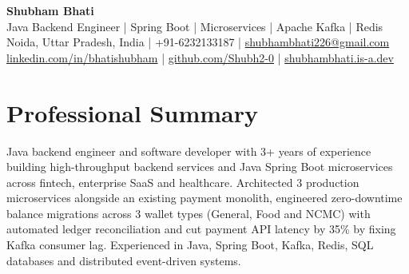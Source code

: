 \documentclass[letterpaper]{article}
\begin{document}
\vspace*{-18pt}
\begin{center}
    \textbf{\Huge Shubham Bhati} \\ \vspace{2pt}
    \small Java Backend Engineer | Spring Boot | Microservices | Apache Kafka | Redis \\
    Noida, Uttar Pradesh, India | +91-6232133187 | \href{mailto:shubhambhati226@gmail.com}{shubhambhati226@gmail.com} \\
    \href{https://linkedin.com/in/bhatishubham}{linkedin.com/in/bhatishubham} | \href{https://github.com/Shubh2-0}{github.com/Shubh2-0} | \href{https://shubhambhati.is-a.dev/}{shubhambhati.is-a.dev}
\end{center}
\vspace{-8pt}

\section{Professional Summary}
\small Java backend engineer and software developer with 3+ years of experience building high-throughput backend services and Java Spring Boot microservices across fintech, enterprise SaaS and healthcare. Architected 3 production microservices alongside an existing payment monolith, engineered zero-downtime balance migrations across 3 wallet types (General, Food and NCMC) with automated ledger reconciliation and cut payment API latency by 35\% by fixing Kafka consumer lag. Experienced in Java, Spring Boot, Kafka, Redis, SQL databases and distributed event-driven systems.
\vspace{1pt}

\end{document}
